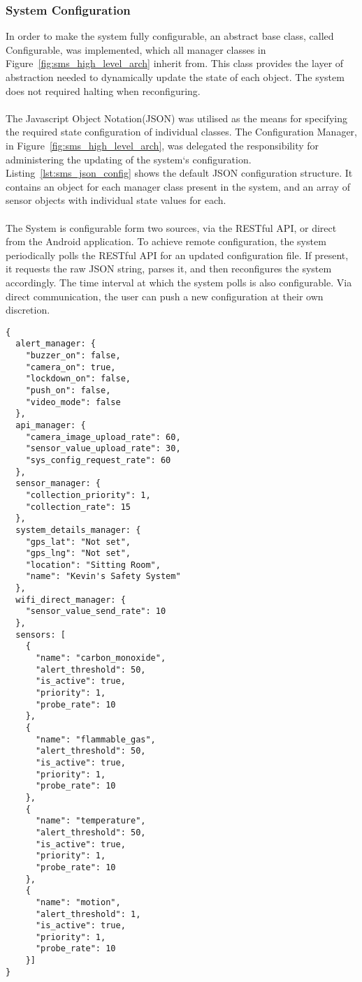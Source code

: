 \documentclass{article}
\begin{document}
\subsubsection{System Configuration}
\label{sssec:sms_sys_config}
In order to make the system fully configurable, an abstract base class, called Configurable, was implemented, which all manager classes in Figure~\ref{fig:sms_high_level_arch} inherit from. This class provides the layer of abstraction needed to dynamically update the state of each object. The system does not required halting when reconfiguring. \\\\
The Javascript Object Notation(JSON) was utilised as the means for specifying the required state configuration of individual classes. The Configuration Manager, in Figure~\ref{fig:sms_high_level_arch}, was delegated the responsibility for administering the updating of the system\lq s configuration. Listing~\ref{lst:sms_json_config} shows the default JSON configuration structure. It contains an object for each manager class present in the system, and an array of sensor objects with individual state values for each. \\\\
The System is configurable form two sources, via the RESTful API, or direct from the Android application. To achieve remote configuration, the system periodically polls the RESTful API for an updated configuration file. If present, it requests the raw JSON string, parses it, and then reconfigures the system accordingly. The time interval at which the system polls is also configurable. Via direct communication, the user can push a new configuration at their own discretion. 
\newpage
\begin{lstlisting}[caption={JSON configuration structure},label={lst:sms_json_config}]
{
  alert_manager: {
    "buzzer_on": false,
    "camera_on": true,
    "lockdown_on": false,
    "push_on": false,
    "video_mode": false
  },
  api_manager: {
    "camera_image_upload_rate": 60,
    "sensor_value_upload_rate": 30,
    "sys_config_request_rate": 60
  },
  sensor_manager: {
    "collection_priority": 1,
    "collection_rate": 15
  },
  system_details_manager: {
    "gps_lat": "Not set",
    "gps_lng": "Not set",
    "location": "Sitting Room",
    "name": "Kevin's Safety System"
  },
  wifi_direct_manager: {
    "sensor_value_send_rate": 10
  },
  sensors: [
    {
      "name": "carbon_monoxide",
      "alert_threshold": 50,
      "is_active": true,
      "priority": 1,
      "probe_rate": 10
    },
    {
      "name": "flammable_gas",
      "alert_threshold": 50,
      "is_active": true,
      "priority": 1,
      "probe_rate": 10
    },
    {
      "name": "temperature",
      "alert_threshold": 50,
      "is_active": true,
      "priority": 1,
      "probe_rate": 10
    },
    {
      "name": "motion",
      "alert_threshold": 1,
      "is_active": true,
      "priority": 1,
      "probe_rate": 10
    }]  
}
\end{lstlisting}
\end{document}
